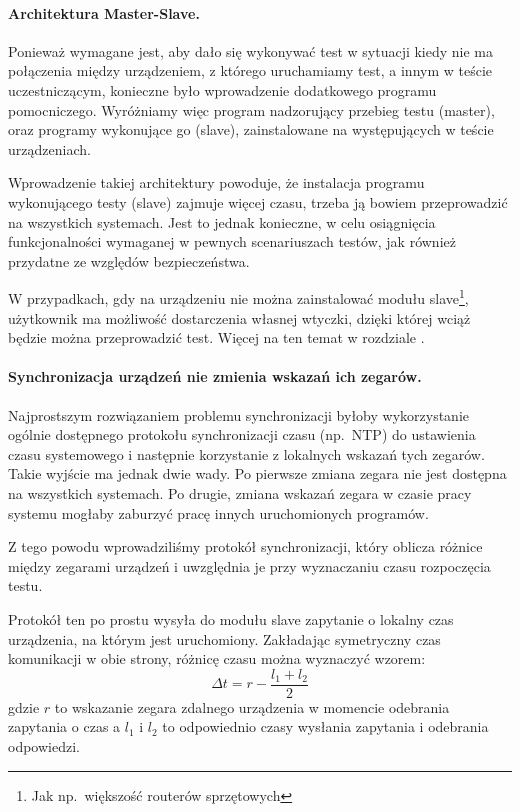 \documentclass[00-praca-magisterska.tex]{subfiles}
\begin{document}
\paragraph{Architektura Master-Slave.} Ponieważ wymagane jest, aby dało się
wykonywać test w sytuacji kiedy nie ma połączenia między urządzeniem, z którego
uruchamiamy test, a innym w teście uczestniczącym, konieczne było wprowadzenie
dodatkowego programu pomocniczego. Wyróżniamy więc program nadzorujący
przebieg testu (master), oraz programy wykonujące go (slave), zainstalowane na
występujących w teście urządzeniach.

Wprowadzenie takiej architektury powoduje, że instalacja programu wykonującego
testy (slave) zajmuje więcej czasu, trzeba ją bowiem przeprowadzić na
wszystkich systemach. Jest to jednak konieczne, w celu osiągnięcia
funkcjonalności wymaganej w pewnych scenariuszach testów, jak również przydatne
ze względów bezpieczeństwa.

W przypadkach, gdy na urządzeniu nie można zainstalować modułu
slave\footnote{Jak np.~większość routerów sprzętowych}, użytkownik ma możliwość
dostarczenia własnej wtyczki, dzięki której wciąż będzie można przeprowadzić
test. Więcej na ten temat w rozdziale .

\paragraph{Synchronizacja urządzeń nie zmienia wskazań ich zegarów.}
Najprostszym rozwiązaniem problemu synchronizacji byłoby wykorzystanie ogólnie
dostępnego protokołu synchronizacji czasu (np.~NTP) do ustawienia czasu
systemowego i następnie korzystanie z lokalnych wskazań tych zegarów. Takie
wyjście ma jednak dwie wady. Po pierwsze zmiana zegara nie jest dostępna na
wszystkich systemach. Po drugie, zmiana wskazań zegara w czasie pracy systemu
mogłaby zaburzyć pracę innych uruchomionych programów.

Z tego powodu wprowadziliśmy protokół synchronizacji, który oblicza różnice
między zegarami urządzeń i uwzględnia je przy wyznaczaniu czasu rozpoczęcia
testu.

Protokół ten po prostu wysyła do modułu slave zapytanie o lokalny czas
urządzenia, na którym jest uruchomiony. Zakładając symetryczny czas komunikacji
w obie strony, różnicę czasu można wyznaczyć wzorem: $$\Delta t = r - \frac{l_1
+ l_2}{2}$$ gdzie $r$ to wskazanie zegara zdalnego urządzenia w momencie
odebrania zapytania o czas a $l_1$ i $l_2$ to odpowiednio czasy wysłania
zapytania i odebrania odpowiedzi.
\end{document}
